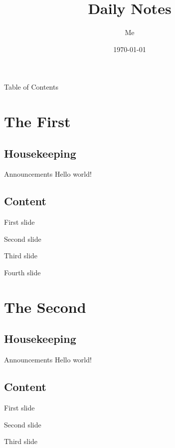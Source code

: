 \documentclass{beamer}
\title[MATH]{Daily Notes}
\author{Me}
\institute{My College}
\date{\today}
\begin{document}
{
\begin{frame}[noframenumbering]
\titlepage
\end{frame}
}

{
\begin{frame}[noframenumbering]{Table of Contents}
\setcounter{tocdepth}{1}
\label{ToC}
\tableofcontents
\end{frame}
}

\section{The First}
\subsection{Housekeeping}

{
    \begin{frame}[noframenumbering]{Announcements}
        Hello world!
    \end{frame}
}

\subsection{Content}
\begin{frame}
    First slide
\end{frame}

\begin{frame}
    Second slide
\end{frame}

\begin{frame}
    Third slide
\end{frame}

\begin{frame}
    Fourth slide
\end{frame}

\section{The Second}
\subsection{Housekeeping}

{
    \begin{frame}[noframenumbering]{Announcements}
        Hello world!
    \end{frame}
}

\subsection{Content}
\begin{frame}
    First slide
\end{frame}

\begin{frame}
    Second slide
\end{frame}

\begin{frame}
    Third slide
\end{frame}
\end{document}
